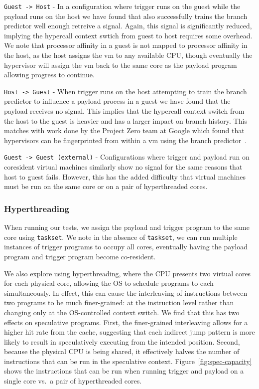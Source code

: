 \texttt{Guest -> Host} - In a configuration where trigger runs on the guest while the 
payload runs on the host we have found that \speculake also successfully trains the 
branch predictor well enough retreive a signal. Again, this signal is significantly
reduced, implying the hypercall context swtich from guest to host requires some 
overhead. We note that processor affinity in a guest is not mapped to processor 
affinity in the host, as the host assigns the vm to any available CPU, though 
eventually the hypervisor will assign the vm back to the same core as the payload 
program allowing progress to continue.

\texttt{Host -> Guest} - When trigger runs on the host attempting to train the 
branch predictor to influence a payload process in a guest we have found that 
the payload receives no signal. This implies that the hypercall context switch 
from the host to the guest is heavier and has a larger impact on branch history. 
This matches with work done by the Project Zero team at Google which found that 
hypervisors can be fingerprinted from within a vm using the branch 
predictor~\cite{project_zero}.

\texttt{Guest -> Guest (external)} - Configurations where trigger and payload 
run on coresident virtual machines similarly show no signal for the same 
reasons that host to guest \speculake fails. However, this has the added difficulty
that virtual machines must be run on the same core or on a pair of 
hyperthreaded cores.



\subsubsection{Hyperthreading}

When running our tests, we assign the payload and trigger program to the same
core using \texttt{taskset}. We note in the absence of \texttt{taskset}, we can
run multiple instances of trigger programs to occupy all cores, eventually
having the payload program and trigger program become co-resident.

We also explore using hyperthreading, where the CPU presents two virtual cores
for each physical core, allowing the OS to schedule programs to each
simultaneously. In effect, this can cause the interleaving of instructions
between two programs to be much finer-grained: at the instruction level rather
than changing only at the OS-controlled context switch. We find that this
has two effects on speculative programs. First, the finer-grained interleaving
allows for a higher hit rate from the cache, suggesting that each indirect jump
pattern is more likely to result in speculatively executing from the intended
position. %
Second, because the physical CPU is being shared, it effectively halves the
number of instructions that can be run in the speculative context.
Figure~\ref{fig:spec-capacity} shows the instructions that can be run when
running trigger and payload on a single core vs.\ a pair of hyperthreaded cores.



